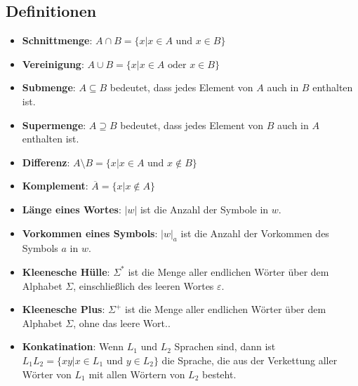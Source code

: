 \documentclass{article}
\begin{document}
\begin{minipage}[t]{0.45\textwidth}
    \subsection*{Definitionen}
    \begin{itemize}
        \item \textbf{Schnittmenge}: $A \cap B = \{x | x \in A \text{ und } x \in B\}$
        \item \textbf{Vereinigung}: $A \cup B = \{x | x \in A \text{ oder } x \in B\}$
        \item \textbf{Submenge}: $A \subseteq B$ bedeutet, dass jedes Element von $A$ auch in $B$ enthalten ist.
        \item \textbf{Supermenge}: $A \supseteq B$ bedeutet, dass jedes Element von $B$ auch in $A$ enthalten ist.
        \item \textbf{Differenz}: $A \setminus B = \{x | x \in A \text{ und } x \notin B\}$
        \item \textbf{Komplement}: $\overline{A} = \{x | x \notin A\}$
        \item \textbf{Länge eines Wortes}: $|w|$ ist die Anzahl der Symbole in $w$.
        \item \textbf{Vorkommen eines Symbols}: $|w|_a$ ist die Anzahl der Vorkommen des Symbols $a$ in $w$.
        \item \textbf{Kleenesche Hülle}: $\Sigma^*$ ist die Menge aller endlichen Wörter über dem Alphabet $\Sigma$, einschließlich des leeren Wortes $\varepsilon$.
        \item \textbf{Kleenesche Plus}: $\Sigma^+$ ist die Menge aller endlichen Wörter über dem Alphabet $\Sigma$, ohne das leere Wort..
        \item \textbf{Konkatination}: Wenn $L_1$ und $L_2$ Sprachen sind, dann ist $L_1 L_2 = \{xy | x \in L_1 \text{ und } y \in L_2\}$ die Sprache, die aus der Verkettung aller Wörter von $L_1$ mit allen Wörtern von $L_2$ besteht.
    \end{itemize}
\end{minipage}
\end{document}
